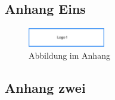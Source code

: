 \subsection{Anhang Eins}
\Blindtext
\begin{figure}[!ht]
    \centering
    \includegraphics[width=0.3\textwidth,angle=0]{src/anhang/abbildungen/abb_anhang1.png}
    \caption[Abbildung im Anhang]{Abbildung im Anhang}
   \label{fig:Abbildung im Anhang}
   \end{figure}

   \Blindtext

\subsection{Anhang zwei}
\Blindtext